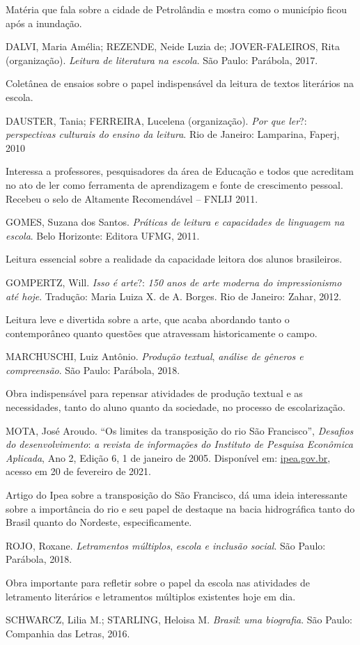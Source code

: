 \documentclass[12pt]{extarticle}
\begin{document}
    Matéria que fala sobre a cidade de Petrolândia e mostra como o
    município ficou após a inundação.

    DALVI, Maria Amélia; REZENDE, Neide Luzia de; JOVER-FALEIROS, Rita
    (organização). \emph{Leitura de literatura na escola}. São Paulo:
    Parábola, 2017.

    Coletânea de ensaios sobre o papel indispensável da leitura de
    textos literários na escola.

    DAUSTER, Tania; FERREIRA, Lucelena (organização). \emph{Por que
    ler}?: \emph{perspectivas culturais do ensino da leitura}. Rio de
    Janeiro: Lamparina, Faperj, 2010

    Interessa a professores, pesquisadores da área de Educação e todos
    que acreditam no ato de ler como ferramenta de aprendizagem e fonte
    de crescimento pessoal. Recebeu o selo de Altamente Recomendável --
    FNLIJ 2011.

    GOMES, Suzana dos Santos. \emph{Práticas de leitura e capacidades de
    linguagem na escola}. Belo Horizonte: Editora UFMG, 2011.

    Leitura essencial sobre a realidade da capacidade leitora dos alunos
    brasileiros.

    GOMPERTZ, Will. \emph{Isso é arte}?: \emph{150 anos de arte moderna
    do impressionismo até hoje}. Tradução: Maria Luiza X. de A. Borges.
    Rio de Janeiro: Zahar, 2012.

    Leitura leve e divertida sobre a arte, que acaba abordando tanto o
    contemporâneo quanto questões que atravessam historicamente o campo.

    MARCHUSCHI, Luiz Antônio\textsc{.} \emph{Produção textual},
    \emph{análise de gêneros e compreensão}. São Paulo: Parábola, 2018.

    Obra indispensável para repensar atividades de produção textual e as
    necessidades, tanto do aluno quanto da sociedade, no processo de
    escolarização.

    MOTA, José Aroudo. ``Os limites da transposição do rio São
    Francisco'', \emph{Desafios do desenvolvimento}: \emph{a revista de
    informações do Instituto de Pesquisa Econômica Aplicada}, Ano 2,
    Edição 6, 1 de janeiro de 2005. Disponível em:
    \href{https://www.ipea.gov.br/desafios/index.php?option=com_content\&view=article\&id=723:os-limites-da-transposicao-do-rio-sao-francisco\&catid=29:artigos-materias\&Itemid=34}{ipea.gov.br},
    acesso em 20 de fevereiro de 2021.

    Artigo do Ipea sobre a transposição do São Francisco, dá uma ideia
    interessante sobre a importância do rio e seu papel de destaque na
    bacia hidrográfica tanto do Brasil quanto do Nordeste,
    especificamente.

    ROJO, Roxane. \emph{Letramentos múltiplos}, \emph{escola e inclusão
    social}. São Paulo: Parábola, 2018.

    Obra importante para refletir sobre o papel da escola nas atividades
    de letramento literários e letramentos múltiplos existentes hoje em
    dia.

    \textsc{SCHWARCZ,} Lilia M.; \textsc{STARLING}, Heloisa M.
    \emph{Brasil}: \emph{uma biografia}. São Paulo: Companhia das
    Letras, 2016.
\end{document}
